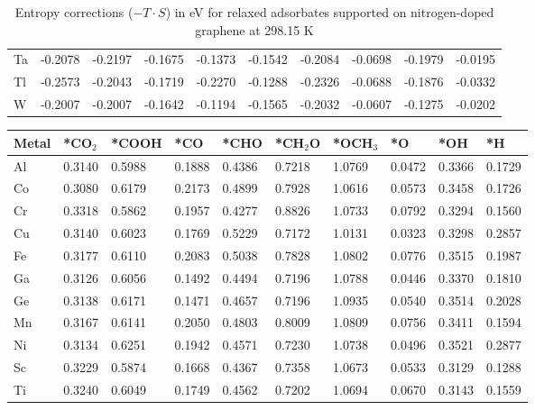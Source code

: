 \begin{table}[h]
{\begin{tabular}{*{10}{l}}
      Ta & -0.2078 & -0.2197 & -0.1675 & -0.1373 & -0.1542 & -0.2084 & -0.0698 & -0.1979 & -0.0195 \\
      Tl & -0.2573 & -0.2043 & -0.1719 & -0.2270 & -0.1288 & -0.2326 & -0.0688 & -0.1876 & -0.0332 \\
      W  & -0.2007 & -0.2007 & -0.1642 & -0.1194 & -0.1565 & -0.2032 & -0.0607 & -0.1275 & -0.0202 \\
      \hline
  \end{tabular}
  }
  \caption{Entropy corrections ($-T \cdot S$) in eV for relaxed adsorbates supported on nitrogen-doped graphene at 298.15 K}
  \label{si_table10:s_n_gra}
\end{table}


\begin{table}[h]
  \centering
  {\fontsize{6}{12}\selectfont
  \begin{tabular}{*{10}{l}}
      \hline
      Metal & *CO$_2$ & *COOH & *CO & *CHO   & *CH$_2$O & *OCH$_3$ & *O & *OH    & *H     \\
      \hline
      Al & 0.3140 & 0.5988 & 0.1888 & 0.4386 & 0.7218 & 1.0769 & 0.0472 & 0.3366 & 0.1729 \\
      Co & 0.3080 & 0.6179 & 0.2173 & 0.4899 & 0.7928 & 1.0616 & 0.0573 & 0.3458 & 0.1726 \\
      Cr & 0.3318 & 0.5862 & 0.1957 & 0.4277 & 0.8826 & 1.0733 & 0.0792 & 0.3294 & 0.1560 \\
      Cu & 0.3140 & 0.6023 & 0.1769 & 0.5229 & 0.7172 & 1.0131 & 0.0323 & 0.3298 & 0.2857 \\
      Fe & 0.3177 & 0.6110 & 0.2083 & 0.5038 & 0.7828 & 1.0802 & 0.0776 & 0.3515 & 0.1987 \\
      Ga & 0.3126 & 0.6056 & 0.1492 & 0.4494 & 0.7196 & 1.0788 & 0.0446 & 0.3370 & 0.1810 \\
      Ge & 0.3138 & 0.6171 & 0.1471 & 0.4657 & 0.7196 & 1.0935 & 0.0540 & 0.3514 & 0.2028 \\
      Mn & 0.3167 & 0.6141 & 0.2050 & 0.4803 & 0.8009 & 1.0809 & 0.0756 & 0.3411 & 0.1594 \\
      Ni & 0.3134 & 0.6251 & 0.1942 & 0.4571 & 0.7230 & 1.0738 & 0.0496 & 0.3521 & 0.2877 \\
      Sc & 0.3229 & 0.5874 & 0.1668 & 0.4367 & 0.7358 & 1.0673 & 0.0533 & 0.3129 & 0.1288 \\
      Ti & 0.3240 & 0.6049 & 0.1749 & 0.4562 & 0.7202 & 1.0694 & 0.0670 & 0.3143 & 0.1559 \\

\end{tabular}}
\end{table}
